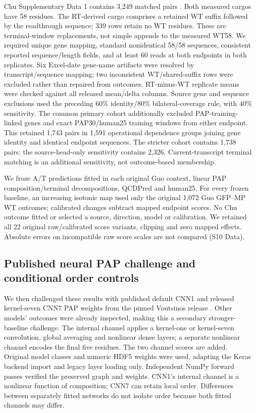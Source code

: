 \documentclass[11pt,a4paper]{article}
\begin{document}
Chu Supplementary Data 1 contains 3,249 matched pairs \cite{chu}.
Both measured cargos have 58 residues. The RT-derived cargo comprises a
retained WT suffix followed by the readthrough sequence; 339 rows retain no
WT residues. These are terminal-window replacements, not simple appends to
the measured WT58. We required unique gene mapping, standard nonidentical
58/58 sequences, consistent reported sequence/length fields, and at least
60 reads at both endpoints in both replicates. Six Excel-date gene-name
artifacts were resolved by transcript/sequence mapping; two inconsistent
WT/shared-suffix rows were excluded rather than repaired from outcomes.
RT-minus-WT replicate means were checked against all released mean/delta
columns. Source gene and sequence exclusions used the preceding $60\%$
identity/$80\%$ bilateral-coverage rule, with $40\%$ sensitivity. The common
primary cohort additionally excluded PAP-training-linked genes and exact
PAP30/human25 training windows from either endpoint. This retained 1,743
pairs in 1,591 operational dependence groups joining gene identity and
identical endpoint sequences. The stricter cohort contains 1,738 pairs;
the source-head-only sensitivity contains 2,326. Current-transcript terminal
matching is an additional sensitivity, not outcome-based membership.

We froze A/T predictions fitted in each original Guo context, linear PAP
composition/terminal decompositions, QCDPred and human25. For every frozen
baseline, an increasing isotonic map used only the original 1,072 Guo GFP--MP
WT outcomes; calibrated changes subtract mapped endpoint scores. No Chu
outcome fitted or selected a source, direction, model or calibration. We
retained all 22 original raw/calibrated score variants, clipping and zero
mapped effects. Absolute errors on incompatible raw score scales are not
compared (S10 Data).

\subsection{Published neural PAP challenge and conditional order controls}
We then challenged these results with published default CNN1 and released
kernel-seven CNN7 PAP weights from the pinned Voutsinos release
\cite{voutsinos}. Other models' outcomes were already inspected, making this
a secondary stronger-baseline challenge. The internal channel applies a
kernel-one or kernel-seven convolution, global averaging and nonlinear dense
layers; a separate nonlinear channel encodes the final five residues.
The two channel scores are added. Original model classes and numeric HDF5
weights were used, adapting the Keras backend import and legacy layer loading
only. Independent NumPy forward passes verified the preserved graph and
weights. CNN1's internal channel is a nonlinear function of composition;
CNN7 can retain local order. Differences between separately fitted networks
do not isolate order because both fitted channels may differ.
\end{document}
